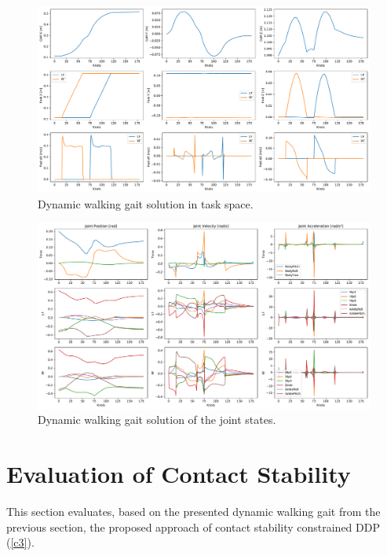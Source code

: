 \begin{figure}[h!]
\centering	
\includegraphics[width=1\textwidth]{fig/walkDynamic/TaskSpace}
\caption{Dynamic walking gait solution in task space.}
\label{fig:walkDynamic_TaskSpace}
\end{figure} 

\begin{figure}[h!]
\centering	
\includegraphics[width=1\textwidth]{fig/walkDynamic/JointState}
\caption{Dynamic walking gait solution of the joint states.}
\label{fig:walkDynamic_JointState}
\end{figure} 



\section{Evaluation of Contact Stability}\label{sec:BipedEvaluation}
This section evaluates, based on the presented dynamic walking gait from the previous section, the proposed approach of contact stability constrained DDP (\cref{c3}).

